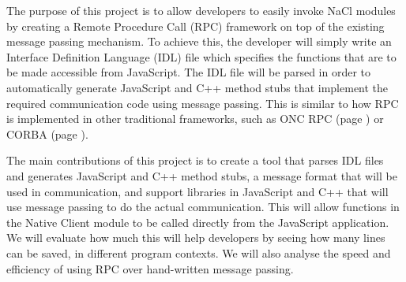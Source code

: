 The purpose of this project is to allow developers to easily invoke NaCl modules by creating a Remote Procedure Call (RPC) framework on top of the existing message passing mechanism. To achieve this, the developer will simply write an Interface Definition Language (IDL) file which specifies the functions that are to be made accessible from JavaScript. The IDL file will be parsed in order to automatically generate JavaScript and C++ method stubs that implement the required communication code using message passing. This is similar to how RPC is implemented in other traditional frameworks, such as ONC RPC (page \pageref{sub:oncrpc_intro}) or CORBA (page \pageref{sub:corba_intro}).

The main contributions of this project is to create a tool that parses IDL files and generates JavaScript and C++ method stubs, a message format that will be used in communication, and support libraries in JavaScript and C++ that will use message passing to do the actual communication. This will allow functions in the Native Client module to be called directly from the JavaScript application. We will evaluate how much this will help developers by seeing how many lines can be saved, in different program contexts. We will also analyse the speed and efficiency of using RPC over hand-written message passing. 
